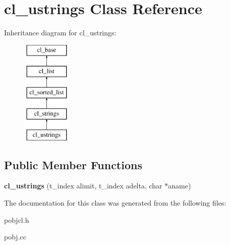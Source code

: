 \hypertarget{classcl__ustrings}{
\section{cl\_\-ustrings Class Reference}
\label{classcl__ustrings}
}
Inheritance diagram for cl\_\-ustrings:\begin{figure}[H]
\begin{center}
\leavevmode
\includegraphics[height=5.000000cm]{classcl__ustrings}
\end{center}
\end{figure}
\subsection*{Public Member Functions}
\begin{DoxyCompactItemize}
\item 
\hypertarget{classcl__ustrings_af2bd507c937c5c80a8571115519f93a1}{
{\bfseries cl\_\-ustrings} (t\_\-index alimit, t\_\-index adelta, char $\ast$aname)}
\label{classcl__ustrings_af2bd507c937c5c80a8571115519f93a1}

\end{DoxyCompactItemize}


The documentation for this class was generated from the following files:\begin{DoxyCompactItemize}
\item 
pobjcl.h\item 
pobj.cc\end{DoxyCompactItemize}
